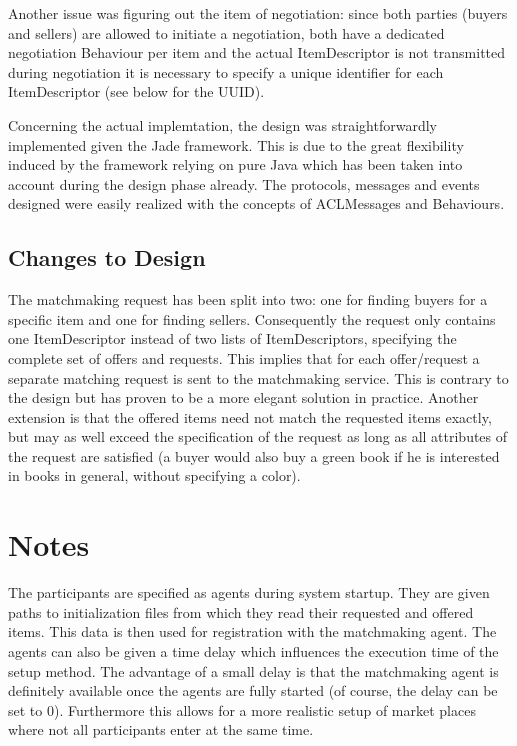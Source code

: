 \documentclass[a4paper,11pt]{article}
\begin{document}
Another issue was figuring out the item of negotiation: since both parties (buyers and sellers) are allowed to initiate a negotiation, both have a dedicated negotiation Behaviour per item and the actual ItemDescriptor is not transmitted during negotiation it is necessary to specify a unique identifier for each ItemDescriptor (see below for the UUID).

Concerning the actual implemtation, the design was straightforwardly implemented given the Jade framework. This is due to the great flexibility induced by the framework relying on pure Java which has been taken into account during the design phase already. The protocols, messages and events designed were easily realized with the concepts of ACLMessages and Behaviours.

\subsection{Changes to Design}
The matchmaking request has been split into two: one for finding buyers for a specific item and one for finding sellers. Consequently the request only contains one ItemDescriptor instead of two lists of ItemDescriptors, specifying the complete set of offers and requests. This implies that for each offer/request a separate matching request is sent to the matchmaking service. This is contrary to the design but has proven to be a more elegant solution in practice. Another extension is that the offered items need not match the requested items exactly, but may as well exceed the specification of the request as long as all attributes of the request are satisfied (a buyer would also buy a green book if he is interested in books in general, without specifying a color).

\section{Notes}
The participants are specified as agents during system startup. They are given paths to initialization files from which they read their requested and offered items. This data is then used for registration with the matchmaking agent. The agents can also be given a time delay which influences the execution time of the setup method. The advantage of a small delay is that the matchmaking agent is definitely available once the agents are fully started (of course, the delay can be set to 0). Furthermore this allows for a more realistic setup of market places where not all participants enter at the same time.
\end{document}
